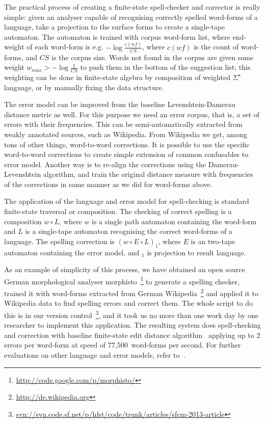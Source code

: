 \documentclass{llncs}
\begin{document}
The practical process of creating a finite-state spell-checker and corrector
is really simple: given an analyser capable of recognising correctly spelled
word-forms of a language, take a projection to the surface forms to create a
single-tape automaton. The automaton is trained with corpus word-form list, 
where end-weight of each word-form is e.g. $-\log\frac{c(wf)}{CS}$, where 
$c(wf)$ is the count of word-forms, and $CS$ is the corpus size. Words not
found in the corpus are given some weight $w_{max} > -\log\frac{1}{CS}$ to
push them in the bottom of the suggestion list; this weighting can be done
in finite-state algebra by composition of weighted $\Sigma^{\star}$ language,
or by manually fixing the data structure.

The error model can be improved from the baseline Levenshtein-Damerau distance
metric as well. For this purpose we need an error corpus, that is, a set of
errors with their frequencies. This can be semi-automatically extracted from
weakly annotated sources, such as Wikipedia. From Wikipedia we get, among tons
of other things, word-to-word corrections. It is possible to use the specific
word-to-word corrections to create simple extension of common confusables to
error model. Another way is to re-align the corrections using the
Damerau-Levenshtein algorithm, and train the original distance measure with
frequencies of the corrections in same manner as we did for word-forms above.

The application of the language and error model for spell-checking is
standard finite-state traversal or composition. The checking of correct spelling
is a composition $w \circ L$, where $w$ is a single path automaton containing
the word-form and $L$ is a single-tape automaton recognising the correct
word-forms of a language. The spelling correction is $(w \circ E \circ L)_1$,
where $E$ is an two-tape automaton containing the error model, and $_1$ is
projection to result language.

As an example of simplicity of this process, we have obtained an open source
German morphological analyser
morphisto~\footnote{\url{http://code.google.com/p/morphisto/}} to generate a
spelling checker, trained it with word-forms extracted from German
Wikipedia~\footnote{\url{http://de.wikipedia.org}} and applied it to Wikipedia
data to find spelling errors and correct them. The whole script to do this is
in our version
control~\footnote{\url{svn://svn.code.sf.net/p/hfst/code/trunk/articles/sfcm-2013-article}},
and it took us no more than one work day by one researcher to implement this
application.  The resulting system does spell-checking and correction with
baseline finite-state edit distance algorithm~\cite{pirinen2010finitestate}
applying up to 2 errors per word-form at speed of 77,500~word-forms per second.
For further evaluations on other language and error models, refer
to~\cite{pirinen2012improving}.
\end{document}
